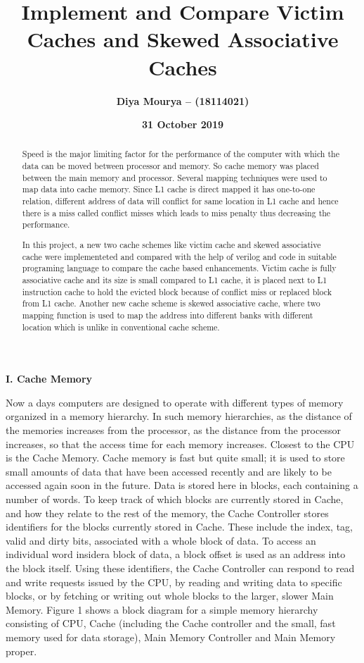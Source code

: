 \documentclass [ 12pt, letterpaper, twoside] {article}
\title {\textbf{Implement and Compare Victim Caches and Skewed Associative Caches }}
\author {\textbf{Diya Mourya – (18114021) }}
\date {\textbf{31 October 2019}}
\begin{document}
\begin {titlepage}
\maketitle
\end {titlepage}

\begin {abstract}
Speed is the major limiting factor for the performance of the computer with which the data can be moved between processor and memory. So cache memory was placed between the main memory and processor. Several mapping techniques were used to map data into cache memory. Since L1 cache is direct mapped it has one-to-one relation, different address of data will conflict for same location in L1 cache and hence there is a miss called conflict misses which leads to miss penalty thus decreasing the performance.

In this project, a new two cache schemes like victim cache and skewed associative cache were implementeted and compared with the help of verilog and code in suitable programing language to compare the cache based enhancements. Victim cache is fully associative cache and its size is small compared to L1 cache, it is placed next to L1 instruction cache to hold the evicted block because of conflict miss or replaced block from L1 cache. Another new cache scheme is skewed associative cache, where two mapping function is used to map the address into different banks with different location which is unlike in conventional cache scheme.
\end {abstract}

\textbf{\large I. Cache Memory }

Now a days computers are designed to operate with different types of memory organized in a memory hierarchy. In such memory hierarchies, as the distance of the memories increases from the processor, as the distance from the processor increases, so that the access time for each memory increases. Closest to the CPU is the Cache Memory. Cache memory is fast but quite small; it is used to store small amounts of data that have been accessed recently and are likely to be accessed again soon in the future. Data is stored here in blocks, each containing a number of words. To keep track of which blocks are currently stored in Cache, and how they relate to the rest of the memory, the Cache Controller stores identifiers for the blocks currently stored in Cache. These include the index, tag, valid and dirty bits, associated with a whole block of data. To access an individual word insidera block of data, a block offset is used as an address into the block itself. Using these identifiers, the Cache Controller can respond to read and write requests issued by the CPU, by reading and writing data to specific blocks, or by fetching or writing out whole blocks to the larger, slower Main Memory. Figure 1 shows a block diagram for a simple memory hierarchy consisting of CPU, Cache (including the Cache controller and the small, fast memory used for data storage), Main Memory Controller and Main Memory proper.
\end{document}
